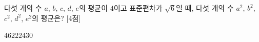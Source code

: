 다섯 개의 수 $a$, $b$, $c$, $d$, $e$의 평균이 $4$이고 표준편차가 $\sqrt{6}$일 때, 다섯 개의 수 $a^2$, $b^2$, $c^2$, $d^2$, $e^2$의 평균은? \mbox{[4점]}
\begin{choices32}{$4$}{$6$}{$22$}{$24$}{$30$}\end{choices32}
